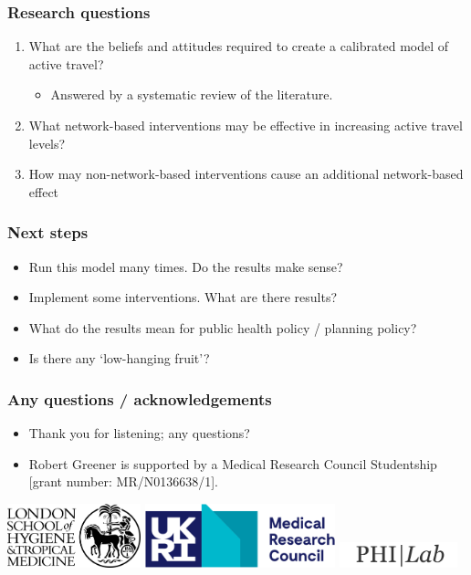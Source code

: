 \documentclass[aspectratio=169]{beamer}
\begin{document}
\begin{frame}
    \frametitle{Research questions}
    \begin{enumerate}
        \item What are the beliefs and attitudes required to create a calibrated model of active travel?
              \begin{itemize}
                  \item Answered by a systematic review of the literature.
              \end{itemize}
        \item What network-based interventions may be effective in increasing active travel levels?
        \item How may non-network-based interventions cause an additional network-based effect
    \end{enumerate}
\end{frame}

\begin{frame}
    \frametitle{Next steps}
    \begin{itemize}
        \item Run this model many times. Do the results make sense?
        \item Implement some interventions. What are there results?
        \item What do the results mean for public health policy / planning policy?
        \item Is there any `low-hanging fruit'?
    \end{itemize}
\end{frame}

\begin{frame}
    \frametitle{Any questions / acknowledgements}
    \begin{itemize}
        \item Thank you for listening; any questions?
        \item Robert Greener is supported by a Medical Research Council Studentship [grant number: MR/N0136638/1].
    \end{itemize}
    \vspace*{4em}
    \includegraphics[height=5em]{figures/LSHTM-logo-bw.jpg}
    \includegraphics[height=5em]{figures/Medical_Research_Council_logo.svg.png}
    \includegraphics[height=2em]{figures/philab.png}
\end{frame}
\end{document}
